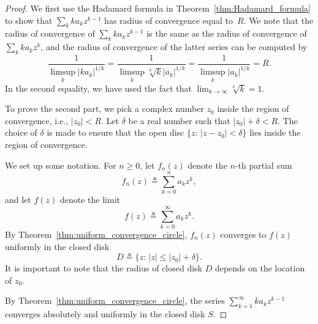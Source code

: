 \begin{proof} 
	We first use the Hadamard formula in Theorem~\ref{thm:Hadamard_formula} to show that $\sum_k k a_k z^{k-1}$ has radius of convergence equal to~$R$. 
	We note that the radius of convergence of $\sum_k k a_k z^{k-1}$ is the same as the radius of convergence of $\sum_k k a_k z^k$, and the radius of convergence of the latter series can be computed by
	$$
	\frac{1}{\limsup_k |k a_k|^{1/k}} =
	\frac{1}{\limsup_k \sqrt[k]{k} |a_k|^{1/k}} =
	\frac{1}{\limsup_k |a_k|^{1/k}} = R.
	$$
	In the second equality, we have used the fact that $\lim_{k\rightarrow\infty} \sqrt[k]{k} = 1$.
	
	To prove the second part, we pick a complex number $z_0$ inside the region of convergence, i.e., $|z_0| < R$. Let $\delta$ be a real number such that $|z_0|+ \delta< R$. The choice of $\delta$ is made to ensure that the open disc $\{z:\, |z-z_0|<\delta\}$ lies inside the region of convergence. 
	
	We set up some notation. For $n\geq 0$, let $f_n(z)$ denote the $n$-th partial sum
	$$
	f_n(z) \triangleq \sum_{k=0}^n a_k z^k,
	$$
	and let $f(z)$ denote the limit
	$$
	f(z) \triangleq \sum_{k=0}^\infty a_k z^k.
	$$
	By Theorem~\ref{thm:uniform_convergence_circle}, $f_n(z)$ converges to $f(z)$ uniformly in the closed disk 
	$$D\triangleq \{z:\, |z|\leq |z_0|+\delta \}.$$ 
	It is important to note that the radius of closed disk $D$ depends on the location of $z_0$.	
	
	By Theorem~\ref{thm:uniform_convergence_circle}, the series $\sum_{k=1}^\infty k a_k z^{k-1}$ converges absolutely and uniformly in the closed disk $S$.
	

\end{proof}

